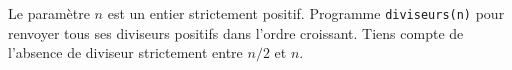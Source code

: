 Le paramètre $n$ est un entier strictement positif. Programme \texttt{diviseurs(n)} pour renvoyer tous ses diviseurs positifs dans l'ordre croissant. Tiens compte de l'absence de diviseur strictement entre $n/2$ et $n$.

